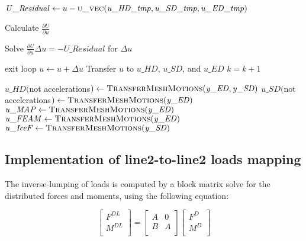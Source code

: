 \documentclass[10pt,letterpaper,oneside,notitlepage]{article}
\begin{document}
\begin{algorithmic}[1]
		\State
		\State$\mathit{U\_Residual} \gets u - \Call{u\_vec}{\mathit{u\_HD\_tmp},\mathit{u\_SD\_tmp},\mathit{u\_ED\_tmp}}$
		\State
		
			\State Calculate $\frac{\partial U}{\partial u}$
		\EndIf
		

		\State Solve  $\frac{\partial U}{\partial u} \Delta u = - \mathit{U\_Residual}$ for $\Delta u$

		\State    
		 
			\State exit loop
		\EndIf
		\State
		\State $u \gets u + \Delta u$
		\State Transfer $u$ to $\mathit{u\_HD}$, $\mathit{u\_SD}$, and $\mathit{u\_ED}$
		\State $k=k+1$
		
	\EndLoop	
	
	\State{}
	\State 
	
	\State$\mathit{u\_HD}($not accelerations$) \gets \Call{TransferMeshMotions}{\mathit{y\_ED},\mathit{y\_SD}}$
	\State$\mathit{u\_SD}($not accelerations$) \gets \Call{TransferMeshMotions}{\mathit{y\_ED}}$
  \State 
	\State $\mathit{u\_MAP}  \gets \Call{TransferMeshMotions}{\mathit{y\_ED}}$
	\State $\mathit{u\_FEAM} \gets \Call{TransferMeshMotions}{\mathit{y\_ED}}$
	\State $\mathit{u\_IceF} \gets \Call{TransferMeshMotions}{\mathit{y\_SD}}$
			
\EndProcedure

\end{algorithmic}

\subsection {Implementation of line2-to-line2 loads mapping}
The inverse-lumping of loads is computed by a block matrix solve for the distributed forces and moments, 
using the following equation:

\begin{equation}
\label{EqLump}
	\begin{bmatrix}
	F^{DL} \\
	M^{DL} \\
	\end{bmatrix}
=
	\begin{bmatrix}
		A & 0 \\
		B & A \\	
	\end{bmatrix}
	\begin{bmatrix}
	F^{D} \\
	M^{D} \\
	\end{bmatrix}
\end{equation}
\end{document}
